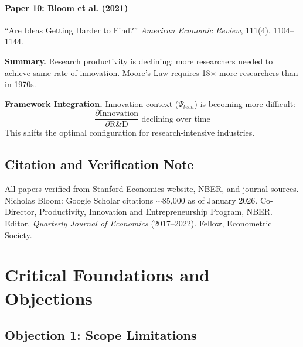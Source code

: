\paragraph{Paper 10: Bloom et al. (2021)}

``Are Ideas Getting Harder to Find?''
\textit{American Economic Review}, 111(4), 1104--1144.

\textbf{Summary.}
Research productivity is declining: more researchers needed to achieve same rate of
innovation. Moore's Law requires 18$\times$ more researchers than in 1970s.

\textbf{Framework Integration.}
Innovation context ($\Psi_{tech}$) is becoming more difficult:
\begin{equation}
  \frac{\partial \text{Innovation}}{\partial \text{R\&D}} \text{ declining over time}
\end{equation}
This shifts the optimal configuration for research-intensive industries.

\subsection{Citation and Verification Note}

All papers verified from Stanford Economics website, NBER, and journal sources.
Nicholas Bloom: Google Scholar citations $\sim$85,000 as of January 2026.
Co-Director, Productivity, Innovation and Entrepreneurship Program, NBER.
Editor, \textit{Quarterly Journal of Economics} (2017--2022).
Fellow, Econometric Society.




\section{Critical Foundations and Objections}
\label{sec:blm-foundations}

\subsection{Objection 1: Scope Limitations}

